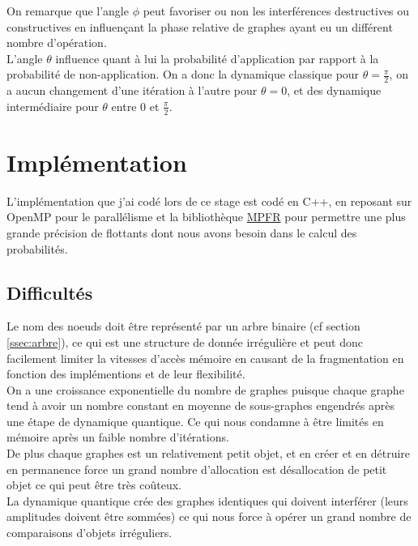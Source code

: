 \documentclass[11pts,french]{article}
\begin{document}
On remarque que l'angle $\phi$ peut favoriser ou non les interférences destructives ou constructives en influençant la phase relative de graphes ayant eu un différent nombre d'opération. \\

L'angle $\theta$ influence quant à lui la probabilité d'application par rapport à la probabilité de non-application. On a donc la dynamique classique pour $\theta = \frac{\pi}{2}$, on a aucun changement d'une itération à l'autre pour $\theta = 0$, et des dynamique intermédiaire pour $\theta$ entre $0$ et $\frac{\pi}{2}$.

\section{ Implémentation }

L'implémentation que j'ai codé lors de ce stage est codé en C++, en reposant sur OpenMP pour le parallélisme et la bibliothèque \href{http://www.mpfr.org}{MPFR} pour permettre une plus grande précision de flottants dont nous avons besoin dans le calcul des probabilités.

\subsection{ Difficultés }

Le nom des noeuds doit être représenté par un arbre binaire (cf section \ref{ssec:arbre}), ce qui est une structure de donnée irrégulière et peut donc facilement limiter la vitesses d'accès mémoire en causant de la fragmentation en fonction des implémentions et de leur flexibilité. \\

On a une croissance exponentielle du nombre de graphes puisque chaque graphe tend à avoir un nombre constant en moyenne de sous-graphes engendrés après une étape de dynamique quantique. Ce qui nous condamne à être limités en mémoire après un faible nombre d'itérations.  \\

De plus chaque graphes est un relativement petit objet, et en créer et en détruire en permanence force un grand nombre d'allocation est désallocation de petit objet ce qui peut être très coûteux. \\

La dynamique quantique crée des graphes identiques qui doivent interférer (leurs amplitudes doivent être sommées) ce qui nous force à opérer un grand nombre de comparaisons d'objets irréguliers.
\end{document}
